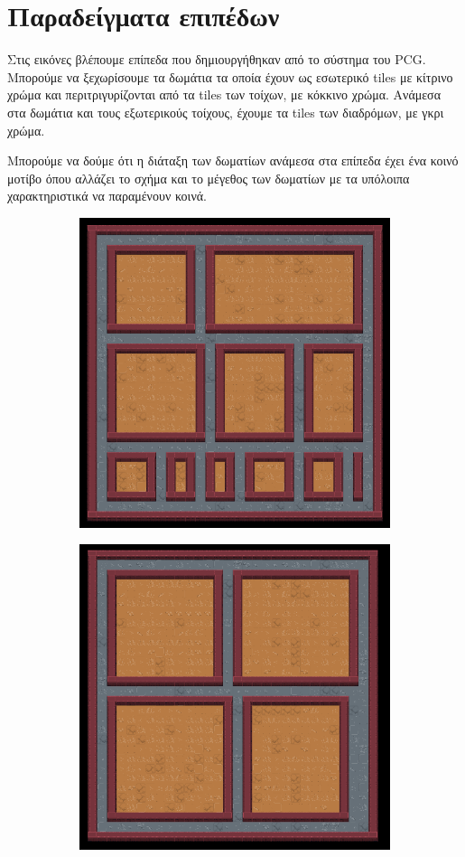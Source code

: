 \section{Παραδείγματα επιπέδων}
\par
Στις εικόνες βλέπουμε επίπεδα που δημιουργήθηκαν από το σύστημα του PCG. Μπορούμε να ξεχωρίσουμε τα δωμάτια τα οποία έχουν ως εσωτερικό tiles με κίτρινο χρώμα και περιτριγυρίζονται από τα tiles των τοίχων, με κόκκινο χρώμα. Ανάμεσα στα δωμάτια και τους εξωτερικούς τοίχους, έχουμε τα tiles των διαδρόμων, με γκρι χρώμα. 
\par
Μπορούμε να δούμε ότι η διάταξη των δωματίων ανάμεσα στα επίπεδα έχει ένα κοινό μοτίβο όπου αλλάζει το σχήμα και το μέγεθος των δωματίων με τα υπόλοιπα χαρακτηριστικά να παραμένουν κοινά.

\begin{figure}[H]
\begin{subfigure}{.5\textwidth}
  \centering
  \includegraphics[width=.8\linewidth]{../images/pcg_images/pcg1.png}
  \label{fig:sfig1}
\end{subfigure}%
\begin{subfigure}{.5\textwidth}
  \centering
  \includegraphics[width=.8\linewidth]{../images/pcg_images/pcg2.png}

\end{subfigure}
\end{figure}
